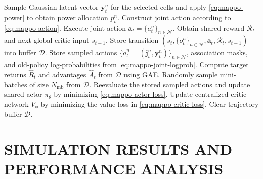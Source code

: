 \documentclass[journal]{IEEEtran}
\newcommand{\revend}[1]{\color{black}\ignorespaces}
\begin{document}
\begin{algorithm}[!b]
\begin{algorithmic}[1]
\STATE Sample Gaussian latent vector $\mathbf y_t^n$ for the selected cells and apply \eqref{eq:mappo-power} to obtain power allocation $p_t^n$.
\STATE Construct joint action according to \eqref{eq:mappo-action}.
\ENDFOR
\STATE Execute joint action $\mathbf a_t=\{a_t^n\}_{n\in\mathcal N}$.
\STATE Obtain shared reward $\mathcal R_t$ and next global critic input $s_{t+1}$.
\STATE Store transition $(s_t,\{o_t^n\}_{n\in\mathcal N},\mathbf a_t,\mathcal R_t,s_{t+1})$ into buffer $\mathcal D$.
\STATE Store sampled actions $\{\widetilde a_t^n=(\mathbf j_t^n,\mathbf y_t^n)\}_{n\in\mathcal N}$, association masks, and old-policy log-probabilities from \eqref{eq:mappo-joint-logprob}.
\ENDFOR
\STATE Compute target returns $\hat R_t$ and advantages $\hat A_t$ from $\mathcal D$ using GAE.
\STATE Randomly sample mini-batches of size $N_{\mathrm{mb}}$ from $\mathcal D$.
\STATE Reevaluate the stored sampled actions and update shared actor $\pi_{\theta}$ by minimizing \eqref{eq:mappo-actor-loss}.
\STATE Update centralized critic network $V_\phi$ by minimizing the value loss in \eqref{eq:mappo-critic-loss}.
\ENDFOR
\STATE Clear trajectory buffer $\mathcal D$.
\ENDFOR
\end{algorithmic}
\normalsize
\revend{}
\end{algorithm}

\section{SIMULATION RESULTS AND PERFORMANCE ANALYSIS}
\label{sec:simulation-results}
\end{document}
